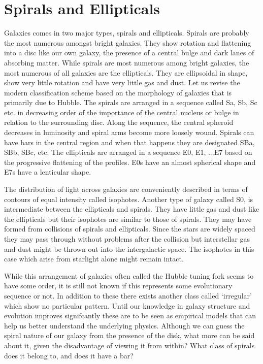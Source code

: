 \documentclass{../template/texnote}
\begin{document}
\section{Spirals and Ellipticals}
Galaxies comes in two major types, spirals and ellipticals.
Spirals are probably the most numerous amongst bright galaxies. They show rotation and flattening into a disc like our own galaxy, the presence of a central bulge and dark lanes of absorbing matter.
While spirals are most numerous among bright galaxies, the most numerous of all galaxies are the ellipticals.
They are ellipsoidal in shape, show very little rotation and have very little gas and dust.
Let us revise the modern classification scheme based on the morphology of galaxies that is primarily due to Hubble.
The spirals are arranged in a sequence called Sa, Sb, Sc etc. in decreasing order of the importance of the central nucleus or bulge in relation to the surrounding disc.
Along the sequence, the central spheroid decreases in luminosity and spiral arms become more loosely wound.
Spirals can have bars in the central region and when that happens they are designated SBa, SBb, SBc, etc.
The ellipticals are arranged in a sequence E0, E1, ...E7 based on the progressive flattening of the profiles. E0s have an almost spherical shape and E7s have a lenticular shape.

The distribution of light across galaxies are conveniently described in terms of contours of equal intensity called isophotes.
Another type of galaxy called S0, is intermediate between the ellipticals and spirals.
They have little gas and dust like the ellipticals but their isophotes are similar to those of spirals.
They may have formed from collisions of spirals and ellipticals.
Since the stars are widely spaced they may pass through without problems after the collision but interstellar gas and dust might be thrown out into the intergalactic space.
The isophotes in this case which arise from starlight alone might remain intact.

While this arrangement of galaxies often called the Hubble tuning fork seems to have some order, it is still not known if this represents some evolutionary sequence or not.
In addition to these there exists another class called `irregular' which show no particular pattern.
Until our knowledge in galaxy structure and evolution improves signifcantly these are to be seen as empirical models that can help us better understand the underlying physics. Although we can guess the spiral nature of our galaxy from the presence of the disk, what more can be said about it, given the disadvantage of viewing it from within? What class of spirals does it belong to, and does it have a bar?
\end{document}
